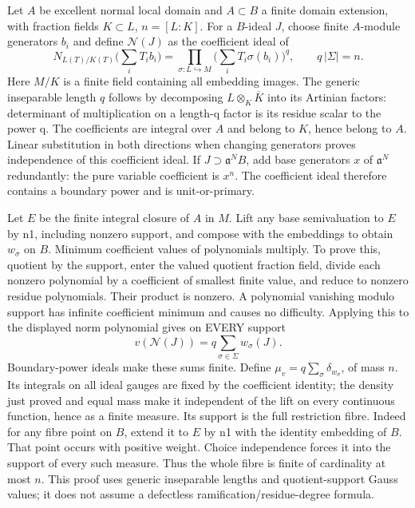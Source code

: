 \documentclass[11pt]{article}
\begin{document}
Let \(A\) be excellent normal local domain and \(A\subset B\) a finite domain extension, with fraction fields \(K\subset L\), \(n=[L:K]\). For a \(B\)-ideal \(J\), choose finite \(A\)-module generators \(b_i\) and define \(\mathcal N(J)\) as the coefficient ideal of
\[
N_{L(T)/K(T)}\Big(\sum_i T_i b_i\Big)
=\prod_{\sigma:L\hookrightarrow M}\Big(\sum_i T_i\sigma(b_i)\Big)^q,
\qquad q\,|\Sigma|=n.
\]
Here \(M/K\) is a finite field containing all embedding images. The generic inseparable length \(q\) follows by decomposing \(L\otimes_K\overline K\) into its Artinian factors: determinant of multiplication on a length-q factor is its residue scalar to the power q. The coefficients are integral over \(A\) and belong to \(K\), hence belong to \(A\). Linear substitution in both directions when changing generators proves independence of this coefficient ideal. If \(J\supset\mathfrak a^N B\), add base generators \(x\) of \(\mathfrak a^N\) redundantly: the pure variable coefficient is \(x^n\). The coefficient ideal therefore contains a boundary power and is unit-or-primary.

Let \(E\) be the finite integral closure of \(A\) in \(M\). Lift any base semivaluation to \(E\) by n1, including nonzero support, and compose with the embeddings to obtain \(w_\sigma\) on \(B\). Minimum coefficient values of polynomials multiply. To prove this, quotient by the support, enter the valued quotient fraction field, divide each nonzero polynomial by a coefficient of smallest finite value, and reduce to nonzero residue polynomials. Their product is nonzero. A polynomial vanishing modulo support has infinite coefficient minimum and causes no difficulty. Applying this to the displayed norm polynomial gives on EVERY support
\[
v(\mathcal N(J))=q\sum_{\sigma\in\Sigma}w_\sigma(J).
\]
Boundary-power ideals make these sums finite. Define \(\mu_v=q\sum_\sigma\delta_{w_\sigma}\), of mass \(n\). Its integrals on all ideal gauges are fixed by the coefficient identity; the density just proved and equal mass make it independent of the lift on every continuous function, hence as a finite measure. Its support is the full restriction fibre. Indeed for any fibre point on \(B\), extend it to \(E\) by n1 with the identity embedding of \(B\). That point occurs with positive weight. Choice independence forces it into the support of every such measure. Thus the whole fibre is finite of cardinality at most \(n\). This proof uses generic inseparable lengths and quotient-support Gauss values; it does not assume a defectless ramification/residue-degree formula.
\end{document}
